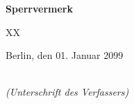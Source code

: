 \thispagestyle{empty}


\vspace*{1cm}

\begin{center}
    \textbf{Sperrvermerk}
\end{center}

\vspace*{1cm}

\noindent 

XX

\vspace{2cm}

\noindent
Berlin, den 01. Januar 2099

\vspace{3cm}

\hspace*{7cm}%
\dotfill\\
\hspace*{8.5cm}%
\textit{(Unterschrift des Verfassers)}
